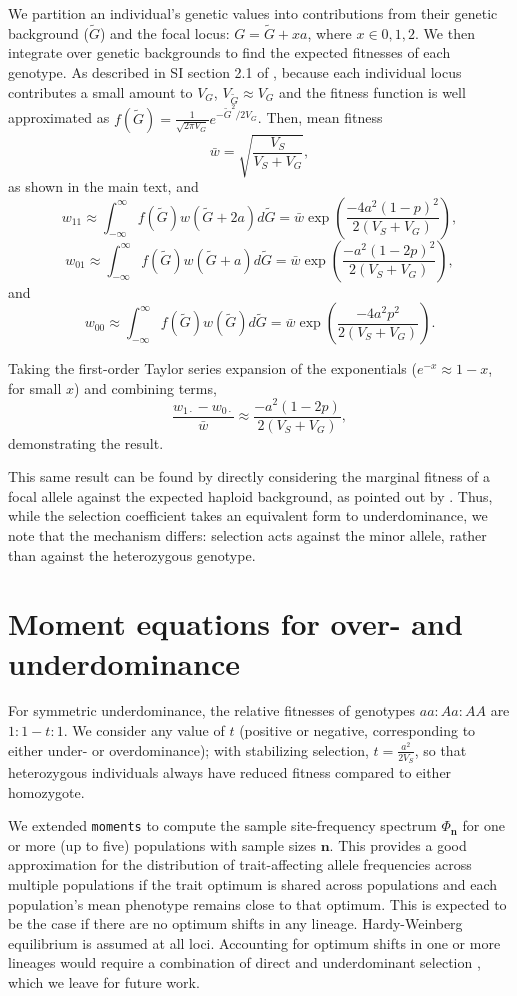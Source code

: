\documentclass{article}
\newcommand{\moments}{\texttt{moments}\xspace}
\begin{document}
We partition an individual's genetic values into contributions from their
genetic background ($\tilde{G}$) and the focal locus: $G=\tilde{G}+xa$, where
$x\in{0,1,2}$.  We then integrate over genetic backgrounds to find the expected
fitnesses of each genotype. As described in SI section 2.1 of
\citet{simons2018population}, because each individual locus contributes a small
amount to $V_G$, $V_{\tilde{G}}\approx V_G$ and the fitness function is well
approximated as \(f(\tilde{G})=\frac{1}{\sqrt{2\pi
V_G}}e^{-\tilde{G}^2/2V_G}\). Then, mean fitness
\[
    \bar{w} = \sqrt{\frac{V_S}{V_S+V_G}},
\]
as shown in the main text, and
\[ 
    w_{11} \approx \int_{-\infty}^\infty f(\tilde{G}) w(\tilde{G} + 2a) d\tilde{G}
    = \bar{w}\exp{\left(\frac{-4a^2(1-p)^2}{2(V_S+V_G)}\right)},
\]
\[
    w_{01} \approx \int_{-\infty}^\infty f(\tilde{G}) w(\tilde{G} + a) d\tilde{G}
    = \bar{w}\exp{\left(\frac{-a^2(1-2p)^2}{2(V_S+V_G)}\right)},
\]
and
\[
    w_{00} \approx \int_{-\infty}^\infty f(\tilde{G}) w(\tilde{G}) d\tilde{G}
    = \bar{w}\exp{\left(\frac{-4a^2p^2}{2(V_S+V_G)}\right)}.
\]

Taking the first-order Taylor series expansion of the exponentials
($e^{-x}\approx1-x$, for small $x$) and combining terms,
\[
    \frac{w_{1\cdot} - w_{0\cdot}}{\bar{w}} \approx \frac{-a^2(1-2p)}{2(V_S+V_G)},
\]
demonstrating the result.

This same result can be found by directly considering the marginal fitness of a
focal allele against the expected haploid background, as pointed out by
\citet{negm2024effect}. Thus, while the selection coefficient takes an
equivalent form to underdominance, we note that the mechanism differs:
selection acts against the minor allele, rather than against the heterozygous
genotype.

\section{Moment equations for over- and underdominance}
\label{sec:moments-underdominance}

For symmetric underdominance, the relative fitnesses of genotypes \(aa:Aa:AA\)
are \(1:1-t:1\). We consider any value of $t$ (positive or negative,
corresponding to either under- or overdominance); with stabilizing selection,
\(t=\frac{a^2}{2V_S}\), so that heterozygous individuals always have reduced
fitness compared to either homozygote.

We extended \moments \citep{jouganous2017inferring} to compute the sample
site-frequency spectrum \(\Phi_{\mathbf{n}}\) for one or more (up to five)
populations with sample sizes \(\mathbf{n}\). This provides a good
approximation for the distribution of trait-affecting allele frequencies across
multiple populations if the trait optimum is shared across populations and each
population's mean phenotype remains close to that optimum. This is expected to
be the case if there are no optimum shifts in any lineage.  Hardy-Weinberg
equilibrium is assumed at all loci. Accounting for optimum shifts in one or
more lineages would require a combination of direct and underdominant selection
\citep[e.g.,][]{hayward2022polygenic}, which we leave for future work.
\end{document}
